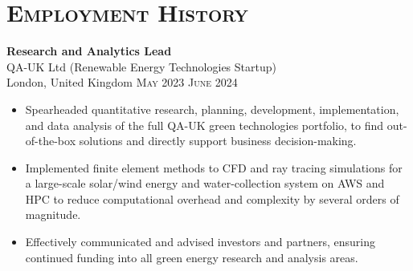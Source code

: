 \documentclass[oneside]{article}
\newcommand{\empitem}[7]{
        {\large \textbf{#1}} \\
        {{\fontseries{medium}\selectfont #2}}\\
        {{\fontseries{light}\selectfont #3}} \hfill
        {\scshape\fontseries{light}\selectfont\footnotesize #4 \textendash{} #5 #6} 
        #7
}
\begin{document}
{\begin{minipage}[t][\dimexpr\textheight-2\fboxrule-2\fboxsep\relax][t]{\dimexpr0.6\textwidth-2\fboxrule-2\fboxsep\relax}
        \section*{\scshape\Large Employment History \hrulefill}
%
        \empitem{Research and Analytics Lead}
        {QA-UK Ltd (Renewable Energy Technologies Startup)}
        {London, United Kingdom}
        {May 2023}
        {June 2024}
        {}
        {
        \begin{itemize}
            \setlength{\itemsep}{-3pt}
            \item Spearheaded quantitative research, planning, development, implementation, and data analysis of the full QA-UK green technologies portfolio, to find out-of-the-box solutions and directly support business decision-making.
            \item Implemented finite element methods to CFD and ray tracing simulations for a large-scale solar/wind energy and water-collection system on AWS and HPC to reduce computational overhead and complexity by several orders of magnitude. 
            \item Effectively communicated and advised investors and partners, ensuring continued funding into all green energy research and analysis areas. %

\end{itemize}}
\end{minipage}}
\end{document}
